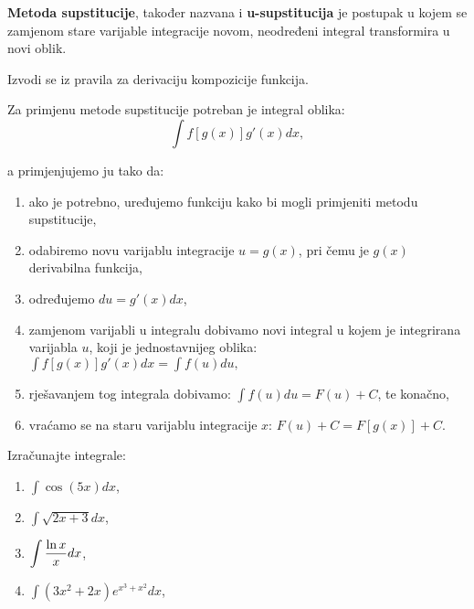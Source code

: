 \textbf{Metoda supstitucije}, također nazvana i \textbf{u-supstitucija} je
postupak u kojem se zamjenom stare varijable integracije novom, neodređeni
integral transformira u novi oblik.

Izvodi se iz pravila za derivaciju kompozicije funkcija.

\bigskip
\noindent
Za primjenu metode supstitucije potreban je integral oblika:
$$
\int f[g(x)]g'(x)dx,
$$

\noindent
a primjenjujemo ju tako da:
\begin{enumerate}
    \item ako je potrebno, uređujemo funkciju kako bi mogli primjeniti metodu
    supstitucije,
    \item odabiremo novu varijablu integracije $u = g(x)$, pri čemu je $g(x)$
    derivabilna funkcija,
    \item određujemo $du = g'(x)dx$,
    \item zamjenom varijabli u integralu dobivamo novi integral u kojem je
    integrirana varijabla $u$, koji je jednostavnijeg oblika: $\displaystyle
    \int f[g(x)]g'(x)dx = \int f(u)du,$
    \item rješavanjem tog integrala dobivamo: $\displaystyle \int f(u)du = F(u)
    + C$, te konačno,
    \item vraćamo se na staru varijablu integracije $x$: $F(u) + C = F[g(x)] +
    C.$
\end{enumerate}

\begin{example}
    Izračunajte integrale:
    \begin{enumerate}
        \item $\displaystyle \int \cos (5x) dx$,
        \item $\displaystyle \int \sqrt{2x + 3} dx$,
        \item $\displaystyle \int {\ln x \over x} dx$,
        \item $\displaystyle \int (3x^2+2x)e^{x^3+x^2} dx$,
    \end{enumerate}
\end{example}
